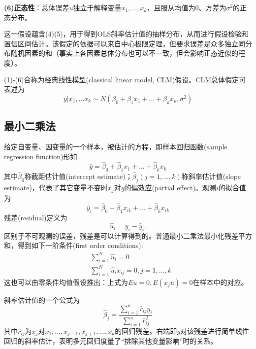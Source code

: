 \par \textbf{(6)正态性}：总体误差$u$独立于解释变量$x_1,\dots,x_k$，且服从均值为0、方差为$\sigma^2$的正态分布。
\par 这一假设蕴含(4)(5)，用于得到OLS斜率估计值的抽样分布，从而进行假设检验和置信区间估计。该假定的依据可以来自中心极限定理，但要求误差是众多独立同分布随机因素的和（事实上各因素总体分布也可以不一致，但会影响正态近似的程度）。

\par (1)-(6)合称为经典线性模型(classical linear model, CLM)假设。CLM总体假定可表述为
\begin{equation}
    y\vert x_1,\dots x_k \sim N(\beta_0+\beta_1x_1+\dots+\beta_kx_k,\sigma^2)
\end{equation}

\subsection{最小二乘法}

\par 给定自变量、因变量的一个样本，被估计的方程，即样本回归函数(sample regression function)形如
\begin{equation}
    \hat{y}=\hat{\beta}_0+\hat{\beta}_1 x_1+\dots+\hat{\beta}_k x_k
\end{equation}
其中$\hat{\beta}_0$称截距估计值(intercept estimate)；$\hat{\beta}_j(j=1,\dots,k)$称斜率估计值(slope estimate)，代表了其它变量不变时$x_j$对$y$的偏效应(partial effect)。观测$i$的拟合值为
\begin{equation}
    \hat{y}_i=\hat{\beta}_0+\hat{\beta}_1 x_{i1}+\dots+\hat{\beta}_k x_{ik}
\end{equation}
残差(residual)定义为
\begin{equation}
    \hat{u}_i = y_i-\hat{y}_i.
\end{equation}
区别于不可观测的误差，残差是可以计算得到的。普通最小二乘法最小化残差平方和，得到如下一阶条件(first order conditions):
\begin{align}
    &\sum_{i=1}^N \hat{u}_i=0\\
    &\sum_{i=1}^N \hat{u}_ix_{ij}=0, j=1,\dots,k
\end{align}
这也可以由零条件均值假设推出：上式为$Eu=0, E(x_ju)=0$在样本中的对应。

\par 斜率估计值的一个公式为
\begin{equation}
    \hat{\beta}_j=\frac{\sum_{i=1}^n \hat{r}_{ij}y_i}{\sum_{i=1}^n \hat{r}_{ij}^2}
\end{equation}
其中$\hat{r}_{ij}$为$x_j$对$x_1,\dots,x_{j-1},x_{j+1},\dots,x_k$的回归残差。右端即$y$对该残差进行简单线性回归的斜率估计，表明多元回归度量了“排除其他变量影响”时的关系。

